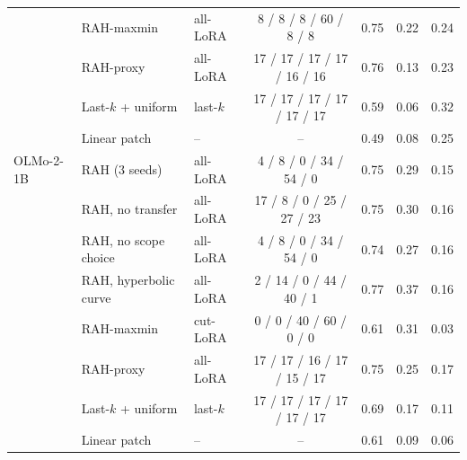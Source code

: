 \begin{tabular}{lllcrrr}
 & RAH-maxmin & all-LoRA & 8 / 8 / 8 / 60 / 8 / 8 & 0.75 & 0.22 & 0.24 \\
 & RAH-proxy & all-LoRA & 17 / 17 / 17 / 17 / 16 / 16 & 0.76 & 0.13 & 0.23 \\
 & Last-$k$ + uniform & last-$k$ & 17 / 17 / 17 / 17 / 17 / 17 & 0.59 & 0.06 & 0.32 \\
 & Linear patch & -- & -- & 0.49 & 0.08 & 0.25 \\
\midrule
OLMo-2-1B & RAH (3 seeds) & all-LoRA & 4 / 8 / 0 / 34 / 54 / 0 & 0.75 & 0.29 & 0.15 \\
 & RAH, no transfer & all-LoRA & 17 / 8 / 0 / 25 / 27 / 23 & 0.75 & 0.30 & 0.16 \\
 & RAH, no scope choice & all-LoRA & 4 / 8 / 0 / 34 / 54 / 0 & 0.74 & 0.27 & 0.16 \\
 & RAH, hyperbolic curve & all-LoRA & 2 / 14 / 0 / 44 / 40 / 1 & 0.77 & 0.37 & 0.16 \\
 & RAH-maxmin & cut-LoRA & 0 / 0 / 40 / 60 / 0 / 0 & 0.61 & 0.31 & 0.03 \\
 & RAH-proxy & all-LoRA & 17 / 17 / 16 / 17 / 15 / 17 & 0.75 & 0.25 & 0.17 \\
 & Last-$k$ + uniform & last-$k$ & 17 / 17 / 17 / 17 / 17 / 17 & 0.69 & 0.17 & 0.11 \\
 & Linear patch & -- & -- & 0.61 & 0.09 & 0.06 \\
\bottomrule
\end{tabular}
